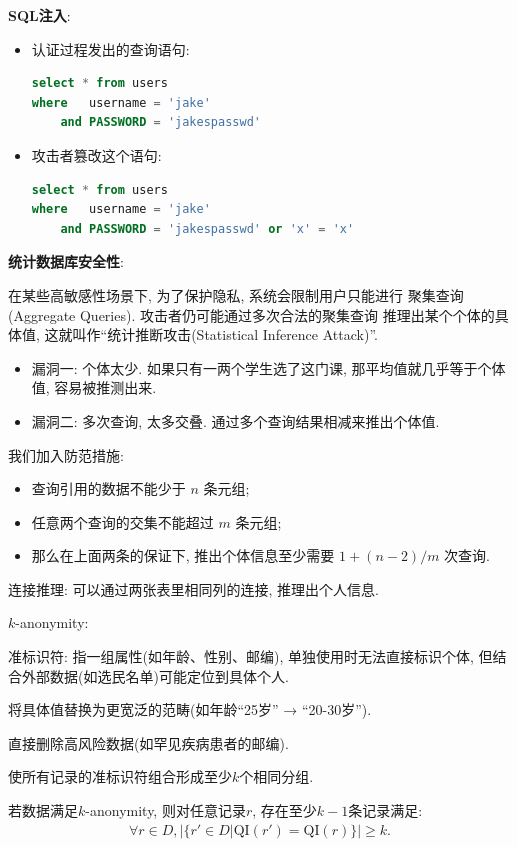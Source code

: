 \textbf{SQL注入}:
\begin{itemize}
    \item 认证过程发出的查询语句:
\begin{lstlisting}[language=SQL]
select * from users
where   username = 'jake'
    and PASSWORD = 'jakespasswd'
\end{lstlisting}
    \item 攻击者篡改这个语句:
\begin{lstlisting}[language=SQL]
select * from users
where   username = 'jake'
    and PASSWORD = 'jakespasswd' or 'x' = 'x'
\end{lstlisting}
\end{itemize}

\textbf{统计数据库安全性}:

在某些高敏感性场景下, 为了保护隐私, 系统会限制用户只能进行 聚集查询(Aggregate Queries).
攻击者仍可能通过多次合法的聚集查询 推理出某个个体的具体值, 这就叫作“统计推断攻击(Statistical Inference Attack)”.
\begin{itemize}
    \item 漏洞一: 个体太少. 如果只有一两个学生选了这门课, 那平均值就几乎等于个体值, 容易被推测出来.
    \item 漏洞二: 多次查询, 太多交叠. 通过多个查询结果相减来推出个体值.
\end{itemize}

我们加入防范措施:
\begin{itemize}
    \item 查询引用的数据不能少于 $n$ 条元组;
    \item 任意两个查询的交集不能超过 $m$ 条元组;
    \item 那么在上面两条的保证下, 推出个体信息至少需要 $1 + (n-2)/m$ 次查询.
\end{itemize}

连接推理: 可以通过两张表里相同列的连接, 推理出个人信息.

$k$-anonymity:
\begin{definition}
    准标识符: 指一组属性(如年龄、性别、邮编), 
    单独使用时无法直接标识个体, 但结合外部数据(如选民名单)可能定位到具体个人.
\end{definition}

\begin{definition}[泛化]
将具体值替换为更宽泛的范畴(如年龄“25岁” → “20-30岁”).
\end{definition}

\begin{definition}[抑制]
    直接删除高风险数据(如罕见疾病患者的邮编).
\end{definition}

使所有记录的准标识符组合形成至少$k$个相同分组.

\begin{definition}[$k$-anonymity]
    若数据满足$k$-anonymity, 则对任意记录$r$, 存在至少$k-1$条记录满足:
    \begin{align*}
        \forall r \in D, |\{r'\in D| \text{QI}(r')=\text{QI}(r)\}| \geq k.
    \end{align*}
\end{definition}
